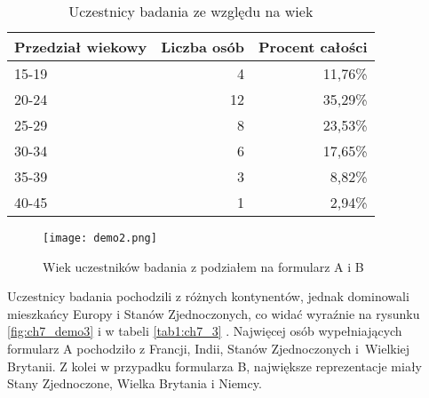 \begin{table}[h!]
    \begin{center}
        \begin{tabular}{|l|r|r|}
            \hline
            Przedział wiekowy & Liczba osób & Procent całości \\
            \hline
            15-19             & 4           & 11,76\%         \\
            20-24             & 12          & 35,29\%         \\
            25-29             & 8           & 23,53\%         \\
            30-34             & 6           & 17,65\%         \\
            35-39             & 3           & 8,82\%          \\
            40-45             & 1           & 2,94\%          \\
            \hline
        \end{tabular}
    \end{center}
    \caption{Uczestnicy badania ze względu na wiek}\label{tab1:ch7_2}
\end{table}

\begin{figure}[h!]
    \centering
    \texttt{[image: demo2.png]}
    \caption{Wiek uczestników badania z podziałem na formularz A i B}
    \label{fig:ch7_demo2}
\end{figure}

\newpage

Uczestnicy badania pochodzili z różnych kontynentów, jednak dominowali mieszkańcy Europy i Stanów
Zjednoczonych, co widać wyraźnie na rysunku \ref{fig:ch7_demo3} i w tabeli \ref{tab1:ch7_3} . Najwięcej
osób wypełniających formularz A pochodziło z Francji, Indii, Stanów Zjednoczonych i~Wielkiej Brytanii. Z kolei w
przypadku formularza B, największe reprezentacje miały Stany Zjednoczone, Wielka Brytania i Niemcy.

